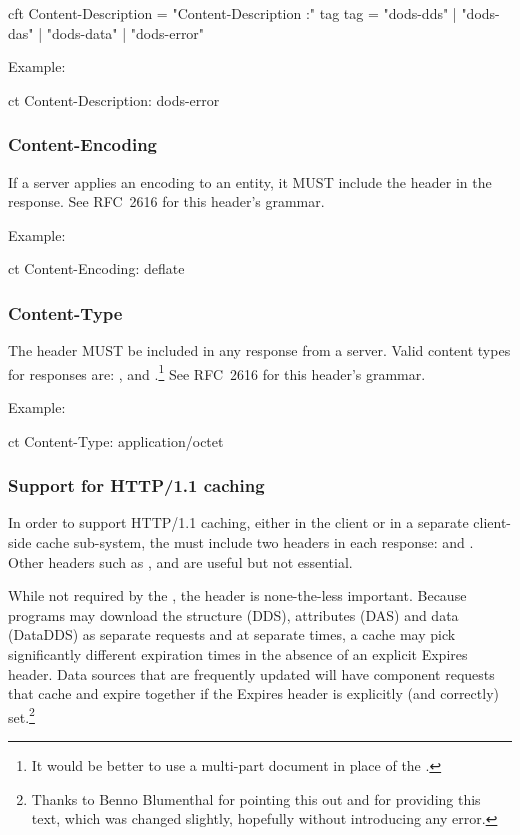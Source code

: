 \documentclass[justify]{nasa-ese}
\begin{document}
\begin{vcode}{cft}
Content-Description = "Content-Description :" tag 
tag                 = "dods-dds" | "dods-das" | "dods-data" | "dods-error" 
\end{vcode}

Example:
\begin{vcode}{ct}
Content-Description: dods-error
\end{vcode}

\subsubsection{Content-Encoding}
\label{content-encoding}
If a \DAP server applies an encoding to an entity, it MUST include the
 header in the response. See RFC~2616\cite{rfc2616}
for this header's grammar.

Example:
\begin{vcode}{ct}
Content-Encoding: deflate
\end{vcode}

\subsubsection{Content-Type}
The  header MUST be included in any response from a
\DAP server. Valid content types for \DAP responses are:
,  and
.\footnote{It would be better to use a multi-part
  document in place of the .} See RFC~2616\cite{rfc2616} for this header's grammar.

Example:
\begin{vcode}{ct}
Content-Type: application/octet
\end{vcode}


\subsubsection{Support for HTTP/1.1 caching}
\label{sec-http-caching}

In order to support HTTP/1.1 caching, either in the client or in a
separate client-side cache sub-system, the \DAP must include two
headers in each response:  and . Other
headers such as ,  and  are
useful but not essential. 

While not required by the \DAP, the  header is
none-the-less important. Because programs may download the structure
(DDS), attributes (DAS) and data (DataDDS) as separate requests and at
separate times, a cache may pick significantly different expiration
times in the absence of an explicit Expires header. Data sources that
are frequently updated will have \DAP component requests that cache
and expire together if the Expires header is explicitly (and
correctly) set.\footnote{Thanks to Benno Blumenthal for pointing this
  out and for providing this text, which was changed slightly,
  hopefully without introducing any error.}
\end{document}

